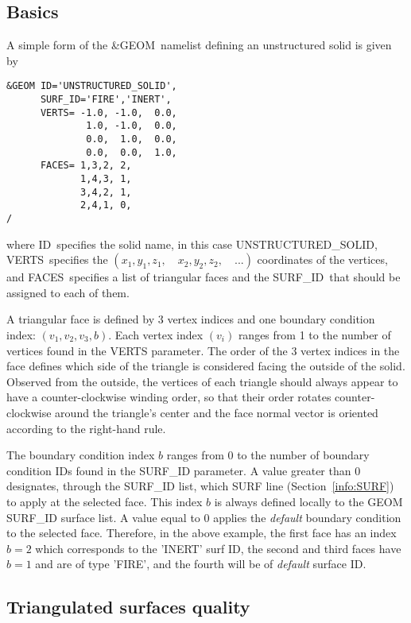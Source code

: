 \documentclass[12pt]{article}
\begin{document}
\subsection{Basics}
\label{info:GEOM_Basics}

A simple form of the {\ct \&GEOM}\ namelist defining an unstructured solid is given by

\begin{verbatim}
&GEOM ID='UNSTRUCTURED_SOLID',
      SURF_ID='FIRE','INERT',
      VERTS= -1.0, -1.0,  0.0, 
              1.0, -1.0,  0.0, 
              0.0,  1.0,  0.0, 
              0.0,  0.0,  1.0,
      FACES= 1,3,2, 2,  
             1,4,3, 1,  
             3,4,2, 1,  
             2,4,1, 0,  
/
\end{verbatim}

\noindent where {\ct ID}\ specifies the solid name, in this case {\ct UNSTRUCTURED\_SOLID},
{\ct VERTS}\ specifies the $(x_1,y_1,z_1, \quad x_2,y_2,z_2, \quad ...)$ coordinates of the vertices,
and {\ct FACES}\ specifies a list of triangular faces and the {\ct SURF\_ID}\ that should be
assigned to each of them.

A triangular face is defined by 3 vertex indices and one boundary condition index: $(v_1,v_2,v_3,b)$.
Each vertex index $(v_i)$ ranges from 1 to the number of vertices found in the {\ct VERTS} parameter.
The order of the 3 vertex indices in the face defines which side of the triangle is considered facing
the outside of the solid. Observed from the outside, the vertices of each triangle should always appear
to have a counter-clockwise winding order, so that their order rotates counter-clockwise around the
triangle's center and the face normal vector is oriented according to the right-hand rule.

The boundary condition index $b$ ranges from 0 to the number of boundary condition {\ct IDs} found in
the {\ct SURF\_ID} parameter. A value greater than 0 designates, through the {\ct SURF\_ID} list, which  
{\ct SURF} line (Section~\ref{info:SURF}) to apply at the selected face. This index $b$ is always defined locally to the
{\ct GEOM SURF\_ID} surface list. A value equal to 0 applies the \textit{default} boundary condition to the selected face.
Therefore, in the above example, the first face has an index $b=2$ which corresponds to the {\ct 'INERT'} surf ID, the 
second and third faces have $b=1$ and are of type {\ct 'FIRE'}, and the fourth will be of \textit{default} surface ID.

\subsection{Triangulated surfaces quality}
\end{document}
